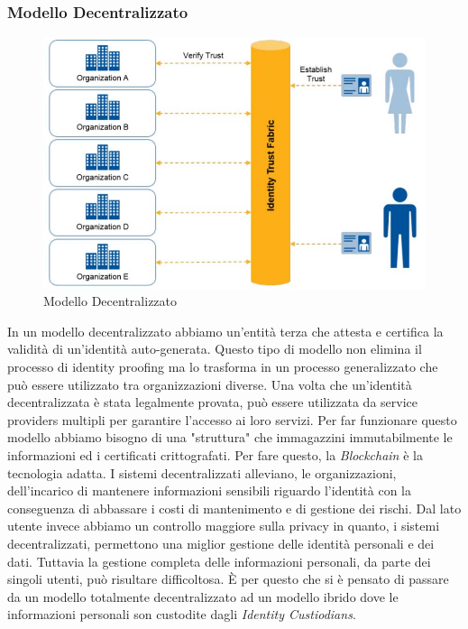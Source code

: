 \subsubsection{Modello Decentralizzato}
\begin{figure}[!h]
	\centering
	\includegraphics[scale=0.50]{immagini/ITF_Decentralizzato}
	\caption{Modello Decentralizzato}
\end{figure}
In un modello decentralizzato abbiamo un'entità terza che attesta e certifica la validità di un'identità auto-generata.
Questo tipo di modello non elimina il processo di identity proofing ma lo trasforma in un processo generalizzato che può essere utilizzato tra organizzazioni diverse.
Una volta che un'identità decentralizzata è stata legalmente provata, può essere utilizzata da service providers multipli per garantire l'accesso ai loro servizi.
Per far funzionare questo modello abbiamo bisogno di una "struttura" che immagazzini immutabilmente le informazioni ed i certificati crittografati.  Per fare questo, la \textit{Blockchain} è la tecnologia adatta.
I sistemi decentralizzati alleviano, le organizzazioni, dell'incarico di mantenere informazioni sensibili riguardo l'identità con la conseguenza di abbassare i costi di mantenimento e di gestione dei rischi.
Dal lato utente invece abbiamo un controllo maggiore sulla privacy in quanto, i sistemi decentralizzati, permettono una miglior gestione delle identità personali e dei dati.
Tuttavia la gestione completa delle informazioni personali, da parte dei singoli utenti, può risultare difficoltosa. È per questo che si è pensato di passare da un modello totalmente decentralizzato ad un modello ibrido dove le informazioni personali son custodite dagli \textit{Identity Custiodians}\cite{ITF_gartner}.
